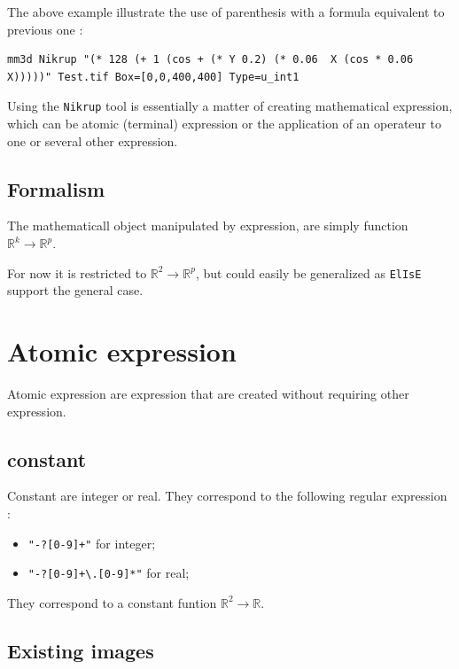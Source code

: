The above example  illustrate the use of parenthesis with a formula equivalent to previous one :


\begin{verbatim}
mm3d Nikrup "(* 128 (+ 1 (cos + (* Y 0.2) (* 0.06  X (cos * 0.06 X)))))" Test.tif Box=[0,0,400,400] Type=u_int1
\end{verbatim}

Using the {\tt Nikrup} tool is essentially a matter of creating mathematical expression, which can be
atomic (terminal) expression or the application of an operateur to  one or several other expression.

\subsection{Formalism }

The mathematicall object manipulated by expression, are simply
function $\mathbb{R}^k  \rightarrow  \mathbb{R}^p $.

For now it is restricted to $\mathbb{R}^2  \rightarrow  \mathbb{R}^p $, but
could easily be generalized as {\tt ElIsE} support the general case.




\section{Atomic expression}

Atomic expression are expression that are created without requiring other expression.

\subsection{constant}

Constant are integer or real. They correspond to the following regular expression :

\begin{itemize}
   \item  {\tt "-?[0-9]+"} for integer;
   \item  {\tt "-?[0-9]+\textbackslash.[0-9]*"} for real;
\end{itemize}

They correspond to a constant funtion $\mathbb{R}^2  \rightarrow  \mathbb{R}$.

\subsection{Existing images}

